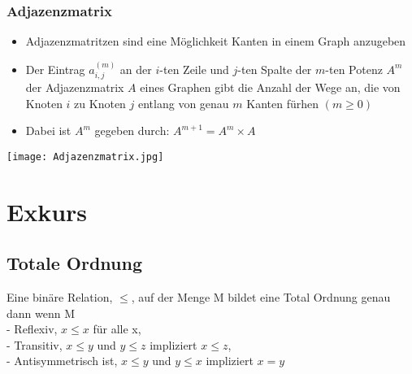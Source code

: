 		\subsubsection{Adjazenzmatrix}
			\begin{minipage}[t]{0.6\textwidth}
				\begin{itemize}
					\item Adjazenzmatritzen sind eine Möglichkeit Kanten in einem Graph anzugeben
					\item Der Eintrag $a^{(m)}_{i,j}$ an der $i$-ten Zeile und $j$-ten Spalte
						der $m$-ten Potenz $A^m$ der Adjazenzmatrix $A$ eines Graphen gibt die Anzahl
						der Wege an, die von Knoten $i$ zu Knoten $j$ entlang von genau $m$ Kanten 
						fürhen $(m\geq0)$
					\item Dabei ist $A^m$ gegeben durch: $A^{m+1} = A^m \times A$ 
				\end{itemize}
			\end{minipage}
			\begin{minipage}[t]{0.35\textwidth}
				\begin{center}
					\texttt{[image: Adjazenzmatrix.jpg]}
				\end{center}
			\end{minipage}

\newpage
\section{Exkurs}
	\subsection{Totale Ordnung}
		Eine binäre Relation, $\leq$, auf der Menge M bildet eine Total Ordnung genau dann wenn M \\
		- Reflexiv, $x \leq x$ für alle x, \\
		- Transitiv, $x \leq y$ und $y \leq z$ impliziert $x \leq z$, \\
		- Antisymmetrisch ist, $x \leq y$ und $y \leq x$ impliziert $x = y$



\vspace{1.5cm}
 